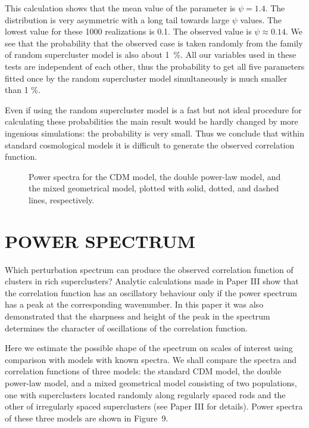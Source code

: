 This calculation shows that the mean value of the parameter is
$\psi=1.4$. The distribution is very asymmetric with a long tail
towards large $\psi$ values. The lowest value for these 1000
realizations is 0.1.  The observed value is $\psi\approx 0.14$.  We
see that the probability that the observed case is taken randomly from
the family of random supercluster model is also about 1~\%.  All our
variables used in these tests are independent of each other, thus the
probability to get all five parameters fitted once by the random
supercluster model simultaneously is much smaller than 1 \%.

Even if using the random supercluster model is a fast but not ideal procedure
for calculating these probabilities the main result would be hardly changed by
more ingenious simulations: the probability is very small.  Thus we conclude
that within standard cosmological models it is difficult to generate the
observed correlation function.


\begin{figure}
\epsfysize=7cm
\vskip -10mm
\caption{
Power spectra  for the CDM model, the double power-law model, and the 
mixed geometrical model, plotted with  solid, dotted, and 
dashed lines, respectively. }
\label{fig9}
\end{figure}

\section{ POWER SPECTRUM}

Which perturbation spectrum can produce the observed correlation function of
clusters in rich superclusters?  Analytic calculations made in Paper III show
that the correlation function has an oscillatory behaviour only if the power
spectrum has a peak at the corresponding wavenumber. In this paper it was also
demonstrated that the sharpness and height of the peak in the spectrum
determines the character of oscillations of the correlation function.

Here we estimate the possible shape of the spectrum on scales of
interest using comparison with models with known spectra.
We shall compare the spectra and correlation functions of three
models: the standard CDM model, the double power-law model, and a
mixed geometrical model consisting of two populations, one with
superclusters located randomly along regularly spaced rods and the
other of irregularly spaced superclusters (see Paper III for
details). Power spectra of these three models are shown in Figure~9.

